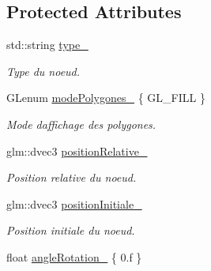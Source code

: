 \subsection*{Protected Attributes}
\begin{DoxyCompactItemize}
\item 
\hypertarget{class_noeud_abstrait_ad53da47a60f4b4fbbd400234cbdcb06b}{}std\+::string \hyperlink{class_noeud_abstrait_ad53da47a60f4b4fbbd400234cbdcb06b}{type\+\_\+}\label{class_noeud_abstrait_ad53da47a60f4b4fbbd400234cbdcb06b}

\begin{DoxyCompactList}\small\item\em Type du noeud. \end{DoxyCompactList}\item 
\hypertarget{class_noeud_abstrait_aa2b57eeb848bc8cb48562788daf81d3e}{}G\+Lenum \hyperlink{class_noeud_abstrait_aa2b57eeb848bc8cb48562788daf81d3e}{mode\+Polygones\+\_\+} \{ G\+L\+\_\+\+F\+I\+L\+L \}\label{class_noeud_abstrait_aa2b57eeb848bc8cb48562788daf81d3e}

\begin{DoxyCompactList}\small\item\em Mode d\textquotesingle{}affichage des polygones. \end{DoxyCompactList}\item 
\hypertarget{class_noeud_abstrait_ae8a50095413ac131cd6d07a384a9ff5d}{}glm\+::dvec3 \hyperlink{class_noeud_abstrait_ae8a50095413ac131cd6d07a384a9ff5d}{position\+Relative\+\_\+}\label{class_noeud_abstrait_ae8a50095413ac131cd6d07a384a9ff5d}

\begin{DoxyCompactList}\small\item\em Position relative du noeud. \end{DoxyCompactList}\item 
\hypertarget{class_noeud_abstrait_a9ac4861933dc8eedb4f5abe6cdc934b8}{}glm\+::dvec3 \hyperlink{class_noeud_abstrait_a9ac4861933dc8eedb4f5abe6cdc934b8}{position\+Initiale\+\_\+}\label{class_noeud_abstrait_a9ac4861933dc8eedb4f5abe6cdc934b8}

\begin{DoxyCompactList}\small\item\em Position initiale du noeud. \end{DoxyCompactList}\item 
\hypertarget{class_noeud_abstrait_a69f867797b7cdc93fbcb5b4d9ae3deee}{}float \hyperlink{class_noeud_abstrait_a69f867797b7cdc93fbcb5b4d9ae3deee}{angle\+Rotation\+\_\+} \{ 0.f \}\label{class_noeud_abstrait_a69f867797b7cdc93fbcb5b4d9ae3deee}


\end{DoxyCompactItemize}
